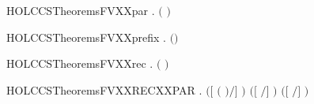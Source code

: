 \newcommand{\HOLCCSTheoremsFVXXnil}{\UseVerbatim{HOLCCSTheoremsFVXXnil}}
\begin{SaveVerbatim}{HOLCCSTheoremsFVXXpar}
\HOLTokenTurnstile{} \HOLSymConst{\HOLTokenForall{}} .  \ensuremath{(} \HOLSymConst{\ensuremath{\mid}} \ensuremath{)} \HOLSymConst{\ensuremath{=}}   \HOLConst{\HOLTokenUnion{}}  
\end{SaveVerbatim}
\newcommand{\HOLCCSTheoremsFVXXpar}{\UseVerbatim{HOLCCSTheoremsFVXXpar}}
\begin{SaveVerbatim}{HOLCCSTheoremsFVXXprefix}
\HOLTokenTurnstile{} \HOLSymConst{\HOLTokenForall{}} .  \ensuremath{(}\HOLSymConst{\ensuremath{\ldotp}}\ensuremath{)} \HOLSymConst{\ensuremath{=}}  
\end{SaveVerbatim}
\newcommand{\HOLCCSTheoremsFVXXprefix}{\UseVerbatim{HOLCCSTheoremsFVXXprefix}}
\begin{SaveVerbatim}{HOLCCSTheoremsFVXXrec}
\HOLTokenTurnstile{} \HOLSymConst{\HOLTokenForall{}} .  \ensuremath{(}  \ensuremath{)} \HOLSymConst{\ensuremath{=}}    
\end{SaveVerbatim}
\newcommand{\HOLCCSTheoremsFVXXrec}{\UseVerbatim{HOLCCSTheoremsFVXXrec}}
\begin{SaveVerbatim}{HOLCCSTheoremsFVXXRECXXPAR}
\HOLTokenTurnstile{} \HOLSymConst{\HOLTokenForall{}}   .
        \ensuremath{(}\ensuremath{[}  \ensuremath{(} \HOLSymConst{\ensuremath{\mid}} \ensuremath{)}\ensuremath{/}\ensuremath{]} \ensuremath{)} \HOLSymConst{\ensuremath{=}}
        \ensuremath{(}\ensuremath{[}  \ensuremath{/}\ensuremath{]} \ensuremath{)} \HOLConst{\HOLTokenUnion{}}  \ensuremath{(}\ensuremath{[}  \ensuremath{/}\ensuremath{]} \ensuremath{)}
\end{SaveVerbatim}
\newcommand{\HOLCCSTheoremsFVXXRECXXPAR}{\UseVerbatim{HOLCCSTheoremsFVXXRECXXPAR}}
